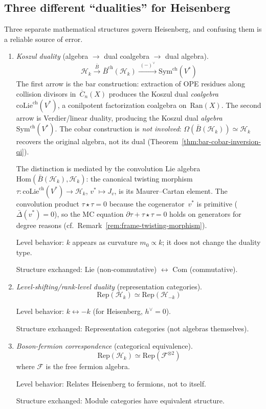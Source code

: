 \subsection{Three different ``dualities'' for Heisenberg}\label{rem:three-dualities-compared}

Three separate mathematical structures govern Heisenberg, and
confusing them is a reliable source of error.

\begin{enumerate}
\item \emph{Koszul duality} (algebra $\to$ dual coalgebra $\to$ dual algebra).
   \[\mathcal{H}_k \xrightarrow{\;\bar{B}\;} \bar{B}^{\mathrm{ch}}(\mathcal{H}_k) \xrightarrow{\;(-)^\vee\;} \mathrm{Sym}^{\mathrm{ch}}(V^*)\]
   The first arrow is the bar construction: extraction of OPE residues
   along collision divisors in~$\overline{C}_n(X)$ produces the Koszul
   dual \emph{coalgebra}~$\mathrm{coLie}^{\mathrm{ch}}(V^*)$, a
   conilpotent factorization coalgebra on~$\mathrm{Ran}(X)$.  The
   second arrow is Verdier/linear duality, producing the Koszul dual
   \emph{algebra}~$\mathrm{Sym}^{\mathrm{ch}}(V^*)$.  The cobar
   construction is \emph{not involved}: $\Omega(\bar{B}(\mathcal{H}_k))
   \simeq \mathcal{H}_k$ recovers the original algebra, not its dual
   (Theorem~\ref{thm:bar-cobar-inversion-qi}).

   The distinction is mediated by the convolution Lie algebra
   $\mathrm{Hom}(\bar{B}(\mathcal{H}_k), \mathcal{H}_k)$: the
   canonical twisting morphism
   $\tau \colon \mathrm{coLie}^{\mathrm{ch}}(V^*) \to \mathcal{H}_k$,
   $v^* \mapsto J_v$, is its Maurer--Cartan element.  The convolution
   product $\tau \star \tau = 0$ because the cogenerator~$v^*$ is
   primitive ($\bar{\Delta}(v^*) = 0$), so the MC equation
   $\partial\tau + \tau \star \tau = 0$ holds on generators for
   degree reasons
   (cf.~Remark~\ref{rem:frame-twisting-morphism}).

   Level behavior: $k$ appears as curvature $m_0 \propto k$; it does not change the duality type.

   Structure exchanged: Lie (non-commutative) $\leftrightarrow$ Com (commutative).

\item \emph{Level-shifting/rank-level duality} (representation categories).
   \[\mathrm{Rep}(\mathcal{H}_k) \simeq \mathrm{Rep}(\mathcal{H}_{-k})\]

   Level behavior: $k \leftrightarrow -k$ (for Heisenberg, $h^{\vee} = 0$).

   Structure exchanged: Representation categories (not algebras themselves).

\item \emph{Boson-fermion correspondence} (categorical equivalence).
   \[\mathrm{Rep}(\mathcal{H}_k) \simeq \mathrm{Rep}(\mathcal{F}^{\otimes 2})\]
   where $\mathcal{F}$ is the free fermion algebra.

   Level behavior: Relates Heisenberg to fermions, not to itself.

   Structure exchanged: Module categories have equivalent structure.
\end{enumerate}

